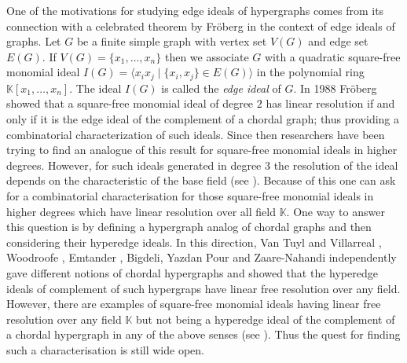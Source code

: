 \documentclass[12pt,reqno]{amsart}
\theoremstyle{definition}
\newcommand{\K}{\mathbb K}
\begin{document}
One of the motivations for studying edge ideals of hypergraphs comes from its connection with a celebrated theorem by Fr\"oberg in the context of edge ideals of graphs. Let $G$ be a finite simple graph with vertex set $V(G)$ and edge set $E(G)$. If $V(G)=\{x_1,\ldots,x_n\}$ then we associate $G$ with a quadratic square-free monomial ideal $I(G)=\langle 
x_ix_j\mid \{x_i,x_j\}\in E(G) \rangle$ in the polynomial ring $\mathbb K[x_1,\ldots,x_n]$. The ideal $I(G)$ is called the {\it edge ideal} of $G$. In 1988 Fr\"oberg \cite{RF} showed that a square-free monomial ideal of degree $2$ has linear resolution if and only if it is the edge ideal of the complement of a chordal graph; thus providing a combinatorial characterization of such ideals. Since then researchers have been trying to find an analogue of this result for square-free monomial ideals in higher degrees. However, for such ideals generated in degree $3$ the resolution of the ideal depends on the characteristic of the base field (see \cite[Section 4]{MK}). Because of this one can ask for a combinatorial characterisation for those square-free monomial ideals in higher degrees which have linear resolution over all field $\K$. One way to answer this question is by defining a hypergraph analog of chordal graphs and then considering their hyperedge ideals. In this direction, Van Tuyl and Villarreal \cite{VTV}, Woodroofe \cite{Woodroofe}, Emtander \cite{Emtander1}, Bigdeli, Yazdan Pour and Zaare-Nahandi \cite{BiYPZN} independently gave different notions of chordal hypergraphs and showed that the hyperedge ideals of complement of such hypergraps have linear free resolution over any field. However, there are examples of square-free monomial ideals having linear free resolution over any field $\K$ but not being a hyperedge ideal of the complement of a chordal hypergraph in any of the above senses (see \cite[Section 4]{BiYPZ}). Thus the quest for finding such a characterisation is still wide open. 
\end{document}
